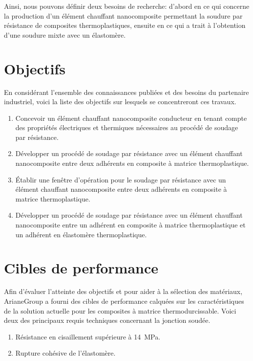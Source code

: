 Ainsi, nous pouvons définir deux besoins de recherche: d'abord en ce qui concerne la production d'un élément chauffant nanocomposite permettant la soudure par résistance de composites thermoplastiques, ensuite en ce qui a trait à l'obtention d'une soudure mixte avec un élastomère. 

\section{Objectifs}
\label{sec:objectifs}

En considérant l'ensemble des connaissances publiées et des besoins du partenaire industriel, voici la liste des objectifs sur lesquels se concentreront ces travaux. 

\begin{enumerate}
	\item Concevoir un élément chauffant nanocomposite conducteur en tenant compte des propriétés électriques et thermiques nécessaires au procédé de soudage par résistance. 
	\item Développer un procédé de soudage par résistance avec un élément chauffant nanocomposite entre deux adhérents en composite à matrice thermoplastique. 
	\item Établir une fenêtre d'opération pour le soudage par résistance avec un élément chauffant nanocomposite entre deux adhérents en composite à matrice thermoplastique. 
	\item Développer un procédé de soudage par résistance avec un élément chauffant nanocomposite entre un adhérent en composite à matrice thermoplastique et un adhérent en élastomère thermoplastique. 
\end{enumerate}

\section{Cibles de performance}

Afin d'évaluer l'atteinte des objectifs et pour aider à la sélection des matériaux, ArianeGroup a fourni des cibles de performance calquées sur les caractéristiques de la solution actuelle pour les composites à matrice thermodurcissable. 
Voici deux des principaux requis techniques concernant la jonction soudée. 

\begin{enumerate}
	\item Résistance en cisaillement supérieure à \SI[locale=FR]{14}{\mega\pascal}. 
	\item Rupture cohésive de l'élastomère. 
\end{enumerate}


